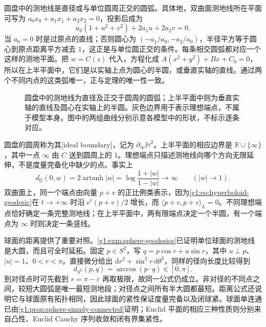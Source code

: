 圆盘中的测地线是直径或与单位圆周正交的圆弧。具体地，双曲面测地线所在平面可写为 \(a_0x_0+a_1x_1+a_2x_2=0\)，投影后成为
\[
	a_0(1+u^2+v^2)+2a_1u+2a_2v=0.
\]
当 \(a_0=0\) 时是过原点的直线；否则圆心为 \((-a_1/a_0,-a_2/a_0)\)，半径平方等于圆心到原点距离平方减去 \(1\)，这正是与单位圆正交的条件。每条相交圆弧都对应一个这样的测地平面。把 \(w=C(z)\) 代入，方程化成 \(A(x^2+y^2)+Bx+C_0=0\)，所以在上半平面中，它们是以实轴上点为圆心的半圆，或垂直实轴的直线。通过两个不同内点的这类弧唯一，正与定理的唯一性一致。

\begin{figure}[htbp]
	\centering
	
	\caption[双曲平面的测地线与理想边界]{圆盘中的测地线为直径及正交于圆周的圆弧；上半平面中则为垂直实轴的直线及圆心在实轴上的半圆。灰色边界用于表示理想端点，不属于模型本身。图中的两组曲线分别示意各模型中的形状，不标示逐条对应。}
	\label{g1:fig:hyperbolic-model-geodesics}
\end{figure}

圆盘的圆周称为其[ideal boundary]，记为 \(\partial_\infty\mathbb H^2\)。上半平面的相应边界是 \(\mathbb R\cup\{\infty\}\)，其中一点 \(\infty\) 由 \(C\) 送到圆周上的 \(1\)。理想端点只描述测地线向哪个方向无限延伸，不是度量完备化中缺少的点。事实上
\[
	d_{\mathbb D}(0,w)=2\operatorname{artanh}|w|
	=\log\frac{1+|w|}{1-|w|}\longrightarrow\infty\qquad(|w|\to1).
\]
双曲面上，同一个端点由向量 \(p+v\) 的正比例类表示，因为\eqref{g1:eq:hyperboloid-geodesic}在 \(t\to+\infty\) 时沿 \(e^t(p+v)/2\) 增长，而 \(\langle p+v,p+v\rangle_L=0\)。不同理想端点恰好确定一条完整测地线；在上半平面中，两有限端点决定一个半圆，有一个端点为 \(\infty\) 时则决定一条竖线。

\ProseParagraphBreak

球面的距离提供了重要对照。\cref{g1:exm:sphere-geodesics}已证明单位球面的测地线是大圆，而且可全时延拓。固定 \(p\in S^2\)，写 \(q=p\cos r+u\sin r\)，其中 \(u\perp p\)、\(|u|=1\)、\(0<r<\pi\)。直接微分给出 \(\mathrm{d}r^2+\sin^2r\,\mathrm{d}\theta^2\)，同样的径向长度比较得到
\begin{equation}
	\label{g1:eq:spherical-distance}
	d_{S^2}(p,q)=\arccos(p\cdot q)\in[0,\pi].
\end{equation}
到对径点时可先截到 \(r=\pi-\varepsilon\) 再取极限，故同一公式仍成立。非对径的不同点之间，较短大圆弧是唯一最短测地段；对径点之间所有半大圆都最短。距离公式还说明它与球面原有拓扑相同，因此球面的紧性保证度量完备以及闭球紧。球面单连通已由\cref{g1:prop:sphere-simply-connected}证明；Euclid 平面的相应三种性质则分别来自凸性、Euclid  Cauchy 序列收敛和闭有界集紧性。

